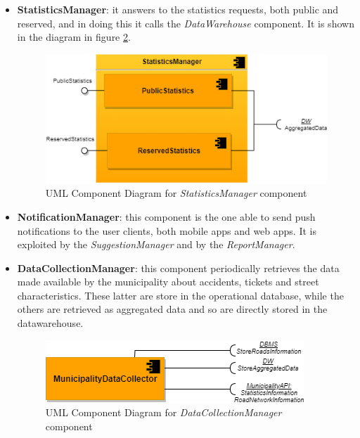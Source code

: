 \documentclass[a4paper]{report}
\begin{document}
\begin{itemize}
\item \textbf{StatisticsManager}: it answers to the statistics requests, both public and reserved, and in doing this it calls the \textit{DataWarehouse} component. It is shown in the diagram in figure \ref{fig:statisticsmgr-component}.

\begin{figure}[htp]
\includegraphics[width=\textwidth]{StatisticsManager}
\caption{UML Component Diagram for \textit{StatisticsManager} component}
\label{fig:statisticsmgr-component}
\end{figure}

\item \textbf{NotificationManager}: this component is the one able to send push notifications to the user clients, both mobile apps and web apps. It is exploited by the \textit{SuggestionManager} and by the \textit{ReportManager}.

\item \textbf{DataCollectionManager}: this component periodically retrieves the data made available by the municipality about accidents, tickets and street characteristics. These latter are store in the operational database, while the others are retrieved as aggregated data and so are directly stored in the datawarehouse.

\begin{figure}[htp]
\includegraphics[width=\textwidth]{DataCollectionManager2}
\caption{UML Component Diagram for \textit{DataCollectionManager} component}
\label{fig:statisticsmgr-component}
\end{figure}


\end{itemize}
\end{document}
